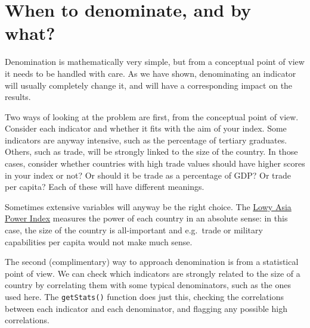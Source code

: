 \documentclass[
]{book}
\begin{document}
\hypertarget{when-to-denominate-and-by-what}{%
\section{When to denominate, and by what?}\label{when-to-denominate-and-by-what}}

Denomination is mathematically very simple, but from a conceptual point of view it needs to be handled with care. As we have shown, denominating an indicator will usually completely change it, and will have a corresponding impact on the results.

Two ways of looking at the problem are first, from the conceptual point of view. Consider each indicator and whether it fits with the aim of your index. Some indicators are anyway intensive, such as the percentage of tertiary graduates. Others, such as trade, will be strongly linked to the size of the country. In those cases, consider whether countries with high trade values should have higher scores in your index or not? Or should it be trade as a percentage of GDP? Or trade per capita? Each of these will have different meanings.

Sometimes extensive variables will anyway be the right choice. The \href{https://power.lowyinstitute.org/}{Lowy Asia Power Index} measures the power of each country in an absolute sense: in this case, the size of the country is all-important and e.g.~trade or military capabilities per capita would not make much sense.

The second (complimentary) way to approach denomination is from a statistical point of view. We can check which indicators are strongly related to the size of a country by correlating them with some typical denominators, such as the ones used here. The \texttt{getStats()} function does just this, checking the correlations between each indicator and each denominator, and flagging any possible high correlations.
\end{document}
